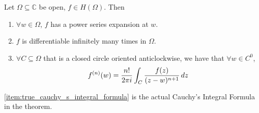 \documentclass[notoc,notitlepage]{tufte-book}
\begin{document}
\begin{thm}\label{thm:cauchy_s_integral_formula_2}
	Let $\Omega \subseteq \mathbb{C}$ be open, $f \in H(\Omega)$. Then
	\begin{enumerate}
		\item $\forall w \in \Omega$, $f$ has a power series expansion at $w$.
		\item $f$ is differentiable infinitely many times in $\Omega$.
		\item $\forall C \subseteq \Omega$ that is a closed circle oriented anticlockwise, we have that $\forall w \in C^0$, \label{item:true_cauchy_s_integral_formula}
			\begin{equation}\label{eq:cauchy_s_integral_formula_2}
			 	f^{(n)} (w) = \frac{n!}{2 \pi i} \int_{C} \frac{f(z)}{(z - w)^{n + 1}} \mathop{}\!d{z} 
			\end{equation} 
	\end{enumerate}
\end{thm}

\begin{remark}
	\cref{item:true_cauchy_s_integral_formula} is the actual Cauchy's Integral Formula in the theorem.
\end{remark}
\end{document}
